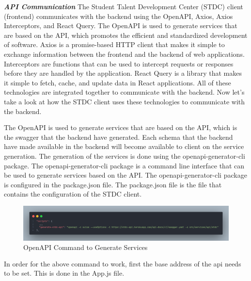 \begin{justify}
    \vspace{0.25cm}
    \newendline \textbf{\textit{API Communication}}\newendline
        The Student Talent Development Center (STDC) client (frontend) communicates with the backend using the OpenAPI, Axios, Axios Interceptors, and React Query. The OpenAPI is used to generate services that are based on the API, which promotes the efficient and standardized development of software. Axios is a promise-based HTTP client that makes it simple to exchange information between the frontend and the backend of web applications. Interceptors are functions that can be used to intercept requests or responses before they are handled by the application. React Query is a library that makes it simple to fetch, cache, and update data in React applications.  All of these technologies are integrated together to communicate with the backend. Now let's take a look at how the STDC client uses these technologies to communicate with the backend.

        \vspace{0.25cm}
        \newendline The OpenAPI is used to generate services that are based on the API, which is the swagger that the backend have generated. Each schema that the backend have made available in the backend will become available to client on the service generation. The generation of the services is done using the openapi-generator-cli package. The openapi-generator-cli package is a command line interface that can be used to generate services based on the API. The openapi-generator-cli package is configured in the package.json file. The package.json file is the file that contains the configuration of the STDC client.

        \begin{figure}[H]
            \centerline{\includegraphics[width=150mm,scale=1]{figures/implementation_and_testing/implementation/frontend/package-openapi.png}}
            \caption{OpenAPI Command to Generate Services}
        \end{figure}

        \vspace{0.25cm}
        \newendline In order for the above command to work, first the base address of the api needs to be set. This is done in the App.js file. 


\end{justify}
